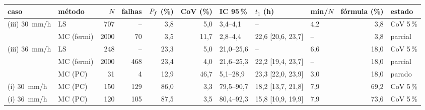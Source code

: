 \begin{tabular}{llrrrrlllrl}
\toprule
caso & método & $N$ & falhas & $P_f$ (\%) & CoV (\%) & IC 95\,\% & $t_1$ (h) & min/$N$ & fórmula (\%) & estado\\
\midrule
(iii) 30~mm/h & LS & 707 & -- & 3{,}8 & 5{,}0 & 3{,}4--4{,}1 & -- & 4{,}2 & 3{,}8 & CoV 5\,\%\\
 & MC (fermi) & 2000 & 70 & 3{,}5 & 11{,}7 & 2{,}8--4{,}4 & 22{,}6 [20{,}6, 23{,}7] & -- & 3{,}8 & parcial\\
(iii) 36~mm/h & LS & 248 & -- & 23{,}3 & 5{,}0 & 21{,}0--25{,}6 & -- & 6{,}6 & 18{,}0 & CoV 5\,\%\\
 & MC (fermi) & 2000 & 468 & 23{,}4 & 4{,}0 & 21{,}6--25{,}3 & 22{,}2 [19{,}4, 23{,}7] & -- & 18{,}0 & parcial\\
 & MC (PC) & 31 & 4 & 12{,}9 & 46{,}7 & 5{,}1--28{,}9 & 23{,}3 [22{,}0, 23{,}9] & 3{,}0 & 18{,}0 & parado\\
(i) 30~mm/h & MC (PC) & 150 & 129 & 86{,}0 & 3{,}3 & 79{,}5--90{,}7 & 18{,}2 [13{,}7, 21{,}8] & 7{,}9 & 69{,}2 & CoV 5\,\%\\
(i) 36~mm/h & MC (PC) & 120 & 105 & 87{,}5 & 3{,}5 & 80{,}4--92{,}3 & 15{,}8 [10{,}9, 19{,}9] & 7{,}9 & 73{,}6 & CoV 5\,\%\\
\bottomrule
\end{tabular}
